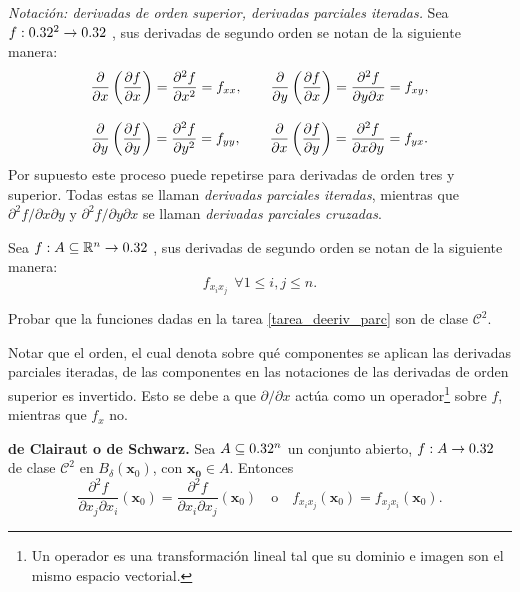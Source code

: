 \emph{Notaci\'on: derivadas de orden superior, derivadas parciales iteradas.} Sea $f:0.32^2\to0.32$ , sus derivadas de segundo orden se notan de la siguiente manera:
\begin{gather*}
    \frac{\partial}{\partial x}\left(\dfrac{\partial f}{\partial x}\right)=
    \frac{\partial^2 f}{\partial x^2}=f_{xx},\qquad
    \frac{\partial}{\partial y}\left(\dfrac{\partial f}{\partial x}\right)=
    \frac{\partial^2 f}{\partial y\partial x}=f_{xy},\\[.3cm]
    \frac{\partial}{\partial y}\left(\dfrac{\partial f}{\partial y}\right)=
    \frac{\partial^2 f}{\partial y^2}=f_{yy},\qquad
    \frac{\partial}{\partial x}\left(\dfrac{\partial f}{\partial y}\right)=
    \frac{\partial^2 f}{\partial x\partial y}=f_{yx}.
\end{gather*}
Por supuesto este proceso puede repetirse para derivadas de orden tres y superior. Todas estas se llaman \emph{derivadas parciales iteradas}, mientras que $\partial^2 f/\partial x\partial y$ y $\partial^2 f/\partial y\partial x$ se llaman \emph{derivadas parciales cruzadas}.   

Sea $f:A \subseteq \mathbb{R}^{n}\to0.32$ ,  sus derivadas de segundo orden se notan de la siguiente manera: $$f_{x_i x_j}\:\: \forall  1 \leq i,j \leq n.  $$
    






\begin{tarea} Probar que la funciones dadas en la tarea \ref{tarea_deeriv_parc} son de clase $\mathcal{C}^2$.
\end{tarea}

\begin{obs}
    Notar que el orden, el cual denota sobre qu\'e componentes se aplican las derivadas parciales iteradas, de las componentes en las notaciones de las derivadas de orden superior es invertido. Esto se debe a que $\partial/\partial x$ act\'ua como un operador\footnote{Un operador es una transformaci\'on lineal tal que su dominio e imagen son el mismo espacio vectorial.} sobre $f$, mientras que $f_x$ no.  
\end{obs}

\begin{theorem}\textbf{de Clairaut o de Schwarz.} \label{teo:schwarz}  Sea $A\subseteq0.32^n$ un conjunto abierto, $f:A\to0.32$ de clase $\mathcal{C}^2$ en $B_\delta(\mathbf{x}_0)$, con $\mathbf{x_0}\in A$. Entonces
    \[
        \dfrac{\partial^{2} f}{\partial x_j \partial x_i}(\mathbf{x}_0)=\dfrac{\partial^{2} f}{\partial x_i \partial x_j}(\mathbf{x}_0)\quad \text{o}\quad f_{x_i x_j}(\mathbf{x}_0)=f_{x_j x_i}(\mathbf{x}_0).
    \]
\end{theorem}

